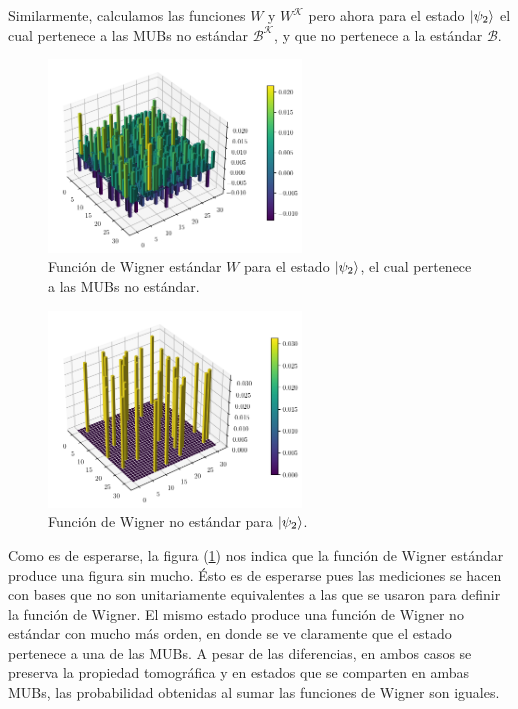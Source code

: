 \documentclass[a4paper]{report}
\begin{document}
  Similarmente, calculamos las funciones $W$ y $W^{\mathcal
  K}$ pero ahora para el estado $\ket{\psi_2}$ el cual
  pertenece a las MUBs no estándar $\mathcal B^{\mathcal
  K}$, y que no pertenece a la estándar $\mathcal B$.
  \begin{figure}[ht]
    \centering
    \includegraphics[width=0.6\textwidth]{
    imgs/wigner-standard-2-5-s2.png}
    \caption{Función de Wigner estándar $W$ para el estado
    $\ket{\psi_2}$, el cual pertenece a las MUBs no estándar.}
    \label{fig:wigner-standard-2-5-s2}
  \end{figure}
  \begin{figure}[ht]
    \centering
    \includegraphics[width=0.6\textwidth]{
    imgs/wigner-kantor-2-5-s2.png}
    \caption{Función de Wigner no estándar para
      $\ket{\psi_2}$.}
    \label{fig:wigner-kantor-2-5-s2}
  \end{figure}
  Como es de esperarse, la figura
  (\ref{fig:wigner-standard-2-5-s2}) nos indica que la
  función de Wigner estándar produce una figura sin mucho.
  Ésto es de esperarse pues las mediciones se hacen con
  bases que no son unitariamente equivalentes a las que se
  usaron para definir la función de Wigner. El mismo estado
  produce una función de Wigner no estándar con mucho más
  orden, en donde se ve claramente que el estado pertenece a
  una de las MUBs. A pesar de las diferencias, en ambos
  casos se preserva la propiedad tomográfica y en estados
  que se comparten en ambas MUBs, las probabilidad obtenidas
  al sumar las funciones de Wigner son iguales.
\end{document}
